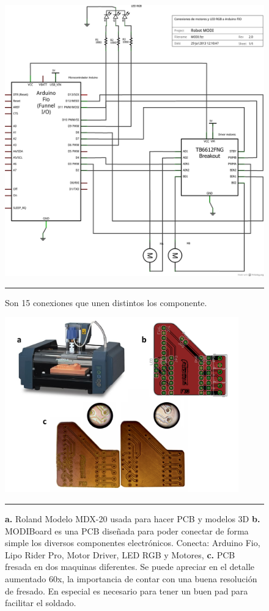 \begin{figure}[htbp]
	\centering
		\includegraphics[width=\textwidth]{./Figures/modi/MODI_schem.png}
		\rule{35em}{0.5pt}
	\caption[Diagrama de conexiones eléctricas necesarias para unir todos los componentes]{Son 15 conexiones que unen distintos los componente.}
	\label{fig:Diagrama cables}
\end{figure}	

\begin{figure}[htbp]
	\centering
		\includegraphics[width=0.9\textwidth]{./Figures/modi/pcb.png}
		\rule{35em}{0.5pt}
	\caption[Fabricación de PCB]{\textbf{a.} Roland Modelo MDX-20 usada para hacer PCB y modelos 3D \textbf{b.} MODIBoard es una PCB diseñada para poder conectar de forma simple los diversos componentes electrónicos. Conecta: Arduino Fio, Lipo Rider Pro, Motor Driver, LED RGB y Motores, \textbf{c. }PCB fresada en dos maquinas diferentes. Se puede apreciar en el detalle aumentado 60x, la importancia de contar con una buena resolución de fresado. En especial es necesario para tener un buen pad para facilitar el soldado.}
	\label{fig:pcb}
\end{figure}

